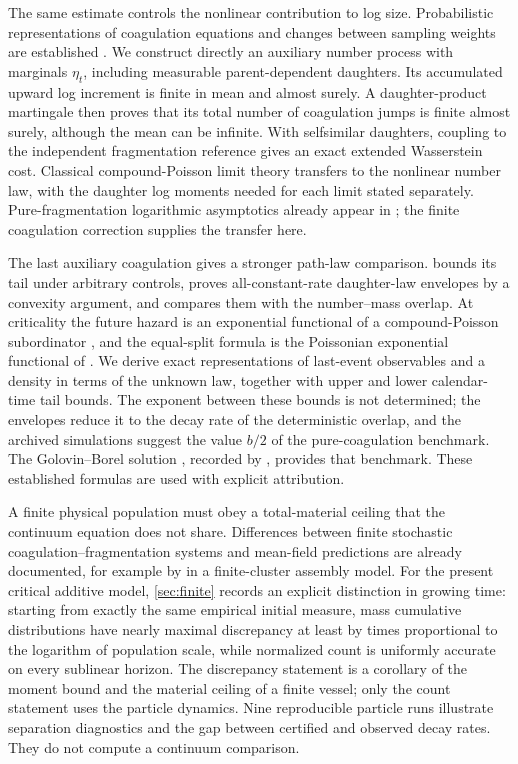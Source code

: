 The same estimate controls the nonlinear contribution to log size.
Probabilistic representations of coagulation equations and changes
between sampling weights are established
\citep{DeaconuTanre2000,DeaconuFournierTanre2002}.
We construct directly an auxiliary number process with marginals
$\eta_t$, including measurable parent-dependent daughters.
Its accumulated upward log increment is finite in mean and almost
surely. A daughter-product martingale then proves that its total
number of coagulation jumps is finite almost surely, although the
mean can be infinite. With selfsimilar daughters, coupling to the
independent fragmentation reference gives an exact extended
Wasserstein cost. Classical compound-Poisson limit theory transfers
to the nonlinear number law, with the daughter log moments needed
for each limit stated separately. Pure-fragmentation logarithmic
asymptotics already appear in
\citet{Bertoin2003,DoumicEscobedo2016}; the finite coagulation
correction supplies the transfer here.

The last auxiliary coagulation gives a stronger path-law comparison.
 bounds its tail under arbitrary controls, proves
all-constant-rate daughter-law envelopes by a convexity argument, and
compares them with the number--mass overlap. At criticality the future
hazard is an exponential functional of a compound-Poisson subordinator
\citep{BertoinYor2005}, and the equal-split formula is the Poissonian
exponential functional of \citet{BertoinBianeYor2004}. We derive exact
representations of last-event observables and a density in terms of
the unknown law, together with upper and lower calendar-time tail
bounds. The exponent between these bounds is not determined; the
envelopes reduce it to the decay rate of the deterministic overlap, and
the archived simulations suggest the value $b/2$ of the pure-coagulation
benchmark. The Golovin--Borel solution \citep{Golovin1963}, recorded by
\citet{Bertoin2009}, provides that benchmark. These established
formulas are used with explicit attribution.

A finite physical population must obey a total-material ceiling that
the continuum equation does not share. Differences between finite
stochastic coagulation--fragmentation systems and mean-field predictions
are already documented, for example by
\citet{DOrsognaLeiChou2015} in a finite-cluster assembly model.
For the present critical additive model, \cref{sec:finite} records an
explicit distinction in growing time: starting from exactly the same
empirical initial measure, mass cumulative distributions have nearly
maximal discrepancy at least by times proportional to the logarithm of
population scale, while normalized count is uniformly accurate on every
sublinear horizon. The discrepancy statement is a corollary of the
moment bound and the material ceiling of a finite vessel; only the count
statement uses the particle dynamics. Nine reproducible particle runs
illustrate separation diagnostics and the gap between certified and
observed decay rates. They do not compute a continuum comparison.

